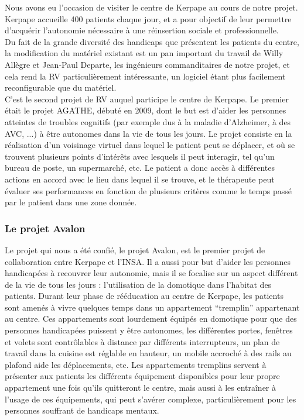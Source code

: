 Nous avons eu l'occasion de visiter le centre de Kerpape au cours de notre projet. Kerpape accueille 400 patients chaque jour, et a pour objectif de leur permettre d'acquérir l'autonomie nécessaire à une réinsertion sociale et professionnelle. \\
Du fait de la grande diversité des handicaps que présentent les patients du centre, la modification du matériel existant est un pan important du travail de Willy Allègre et Jean-Paul Departe, les ingénieurs commanditaires de notre projet, et cela rend la RV particulièrement intéressante, un logiciel étant plus facilement reconfigurable que du matériel.\cite{kerpape}\\


C'est le second projet de RV auquel participe le centre de Kerpape. Le premier était le projet AGATHE, débuté en 2009, dont le but est d'aider les personnes atteintes de troubles cognitifs (par exemple dus à la maladie d'Alzheimer, à des AVC, ...) à être autonomes dans la vie de tous les jours. Le projet consiste en la réalisation d'un \og voisinage virtuel \fg{} dans lequel le patient peut se déplacer, et où se trouvent plusieurs points d'intérêts avec lesquels il peut interagir, tel qu'un bureau de poste, un supermarché, etc. Le patient a donc accès à différentes actions en accord avec le lieu dans lequel il se trouve, et le thérapeute peut évaluer ses performances en fonction de plusieurs critères comme le temps passé par le patient dans une zone donnée.\cite{agathe}

\subsubsection{Le projet Avalon}

Le projet qui nous a été confié, le projet Avalon, est le premier projet de collaboration entre Kerpape et l'INSA. Il a aussi pour but d'aider les personnes handicapées à recouvrer leur autonomie, mais il se focalise sur un aspect différent de la vie de tous les jours : l'utilisation de la domotique dans l'habitat des patients. Durant leur phase de rééducation au centre de Kerpape, les patients sont amenés à vivre quelques temps dans un appartement \enquote{tremplin} appartenant au centre. Ces appartements sont lourdement équipés en domotique pour que des personnes handicapées puissent y être autonomes, les différentes portes, fenêtres et volets sont contrôlables à distance par différents interrupteurs, un plan de travail dans la cuisine est réglable en hauteur, un mobile accroché à des rails au plafond aide les déplacements, etc.
Les appartements tremplins servent à présenter aux patients les différents équipement disponibles pour leur propre appartement une fois qu'ils quitteront le centre, mais aussi à les entraîner à l'usage de ces équipements, qui peut s'avérer complexe, particulièrement pour les personnes souffrant de handicaps mentaux. \\

